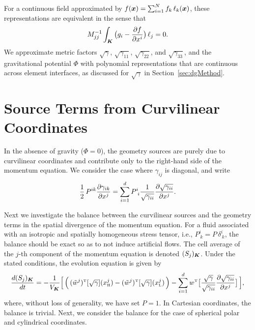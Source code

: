 \documentclass[10pt,preprint]{aastex}
\begin{document}
For a continuous field approximated by $f(\boldsymbol{x})=\sum_{i=1}^{N}f_{k}\,\ell_{k}(\boldsymbol{x})$, these representations are equivalent in the sense that
\begin{equation}
  M_{jj}^{-1}\int_{\boldsymbol{K}}\big(g_{i}-\frac{\partial f}{\partial x^{i}}\big)\,\ell_{j}=0.  
\end{equation}
We approximate metric factors $\sqrt{\gamma}$, $\sqrt{\gamma_{11}}$, $\sqrt{\gamma_{22}}$, and $\sqrt{\gamma_{33}}$, and the gravitational potential $\Phi$ with polynomial representations that are continuous across element interfaces, as discussed for $\sqrt{\gamma}$ in Section~\ref{sec:dgMethod}.  

\section{Source Terms from Curvilinear Coordinates}

In the absence of gravity ($\Phi=0$), the geometry sources are purely due to curvilinear coordinates and contribute only to the right-hand side of the momentum equation.  
We consider the case where $\gamma_{ij}$ is diagonal, and write
\begin{equation}
  \frac{1}{2}\,P^{ik}\frac{\partial \gamma_{ik}}{\partial x^{j}}
  =\sum_{i=1}^{d}P_{~i}^{i}\frac{1}{\sqrt{\gamma_{ii}}}\frac{\partial \sqrt{\gamma_{ii}}}{\partial x^{j}}.
\end{equation}

Next we investigate the balance between the curvilinear sources and the geometry terms in the spatial divergence of the momentum equation.  
For a fluid associated with an isotropic and spatially homogeneous stress tensor, i.e., $P_{~k}^{i}=P\,\delta_{~k}^{i}$, the balance should be exact so as to not induce artificial flows.  
The cell average of the $j$-th component of the momentum equation is denoted $(S_{j})_{\boldsymbol{K}}$.  
Under the stated conditions, the evolution equation is given by
\begin{equation}
  \frac{d (S_{j})_{\boldsymbol{K}}}{d t}
  =-\frac{1}{V_{\boldsymbol{K}}}
  \Big[\,
  \Big(\,
    (\tilde{w}^{j})^{\mbox{\tiny T}}[\sqrt{\gamma}](x^{j}_{\mbox{\tiny H}})
    -(\tilde{w}^{j})^{\mbox{\tiny T}}[\sqrt{\gamma}](x^{j}_{\mbox{\tiny L}})
  \,\Big)
  -\sum_{i=1}^{d}w^{\mbox{\tiny T}}
  \big[\frac{\sqrt{\gamma}}{\sqrt{\gamma_{ii}}}\frac{\partial \sqrt{\gamma_{ii}}}{\partial x^{j}}\big]
  \,\Big],
  \label{eq:MomentumUniformP}
\end{equation}
where, without loss of generality, we have set $P=1$.  
In Cartesian coordinates, the balance is trivial.  
Next, we consider the balance for the case of spherical polar and cylindrical coordinates.  
\end{document}
